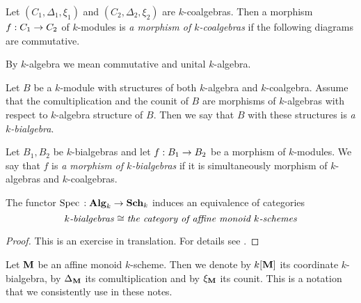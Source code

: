 \begin{definition}
Let $\left(C_1,\Delta_1,\xi_1\right)$ and $\left(C_2,\Delta_2,\xi_2\right)$ are $k$-coalgebras. Then a morphism $f:C_1\rightarrow C_2$ of $k$-modules is \textit{a morphism of $k$-coalgebras} if the following diagrams are commutative.
\begin{center}
\end{center} 
\end{definition}
\noindent
By $k$-algebra we mean commutative and unital $k$-algebra.

\begin{definition}
Let $B$ be a $k$-module with structures of both $k$-algebra and $k$-coalgebra. Assume that the comultiplication and the counit of $B$ are morphisms of $k$-algebras with respect to $k$-algebra structure of $B$. Then we say that $B$ with these structures is \textit{a $k$-bialgebra}. 
\end{definition}

\begin{definition}
Let $B_1,B_2$ be $k$-bialgebras and let $f:B_1\rightarrow B_2$ be a morphism of $k$-modules. We say that $f$ is \textit{a morphism of $k$-bialgebras} if it is simultaneously morphism of $k$-algebras and $k$-coalgebras. 
\end{definition}

\begin{theorem}\label{theorem:bialgebras_and_monoid_k_functors}
The functor $\mathrm{Spec}\,:\mathbf{Alg}_k\rightarrow \mathbf{Sch}_k$ induces an equivalence of categories
$$\mbox{\emph{$k$-bialgebras}} \cong \mbox{\emph{the category of affine monoid $k$-schemes}}$$
\end{theorem}
\begin{proof}
This is an exercise in translation. For details see {\cite[II, 1.6]{demazure1970groupes}}.
\end{proof}
\noindent
Let $\mathbf{M}$ be an affine monoid $k$-scheme. Then we denote by $k[\mathbf{M}]$ its coordinate $k$-bialgebra, by $\Delta_{\mathbf{M}}$ its comultiplication and by $\xi_{\mathbf{M}}$ its counit. This is a notation that we consistently use in these notes.

